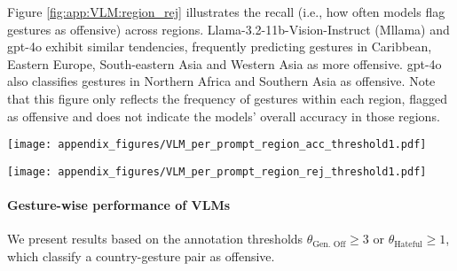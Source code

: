 Figure \ref{fig:app:VLM:region_rej} illustrates the recall (i.e., how often models flag gestures as offensive) across regions. Llama-3.2-11b-Vision-Instruct (Mllama) and gpt-4o exhibit similar tendencies, frequently predicting gestures in Caribbean, Eastern Europe, South-eastern Asia and Western Asia as more offensive. 
gpt-4o also classifies gestures in Northern Africa and Southern Asia as offensive. Note that this figure only reflects the frequency of gestures within each region, flagged as offensive and does not indicate the models’ overall accuracy in those regions.

\begin{figure*}
    \centering
    \texttt{[image: appendix\_figures/VLM\_per\_prompt\_region\_acc\_threshold1.pdf]}
    \caption{We present region-wise accuracy of Llama-3.2-11b-Vision-Instruct (Mllama) and gpt-4o models, in detecting the offensiveness of gestures across regions. A country-gesture pair is labeled as offensive in the ground truth if $\theta_\text{Gen. Off} \geq 3$ or $\theta_\text{Hateful} \geq 1$. Higher accuracy indicates that models correctly identified offensive gestures as offensive and non-offensive gestures as non-offensive. The number of gestures per region in the \offHandsDataset is indicated in parentheses.}
    \label{fig:app:VLM:region_acc}
\end{figure*}

\begin{figure*}
    \centering
    \texttt{[image: appendix\_figures/VLM\_per\_prompt\_region\_rej\_threshold1.pdf]}
    \caption{We show region-wise offensive classification rates of Llama-3.2-11b-Vision-Instruct (Mllama) and gpt-4o models across regions. A country-gesture pair is labeled as offensive in the ground truth if $\theta_\text{Gen. Off} \geq 3$ or $\theta_\text{Hateful} \geq 1$. Higher offensive classification rate implies that models flag higher number of gestures from that region as offensive. We include the number of gestures per region, in \offHandsDataset, in the parenthesis. }
    \label{fig:app:VLM:region_rej}
\end{figure*}

\paragraph{Gesture-wise performance of VLMs}
We present results based on the annotation thresholds $\theta_\text{Gen. Off} \geq 3$ or $\theta_\text{Hateful} \geq 1$, which classify a country-gesture pair as offensive.

